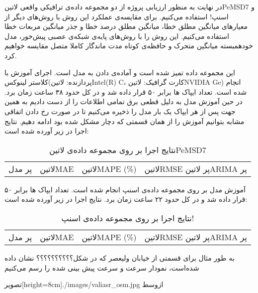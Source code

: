 
در نهایت به منظور ارزیابی پروژه از دو مجموعه داده‌ی ترافیکی واقعی ‌لاتین{PeMSD7} و اسنپ! استفاده می‌کنیم.
برای مقایسه‌ی عملکرد این روش با روش‌های دیگر از معیارهای میانگین مطلق خطا، میانگین مطلق درصد خطا و جذر میانگین مربعات خطا استفاده می‌کنیم.
این روش را با روش‌های پایه‌ی شبکه‌ی عصبی پیش‌خور، مدل خودهمبسته میانگین متحرک و حافظه‌ی کوتاه مدت ماندگار کاملا متصل  مقایسه خواهیم کرد.


این مجموعه داده تمیز شده است و آماده‌ی دادن به مدل است. اجرای آموزش با کلاستر لینوکس(پردازنده: ‌لاتین{Intel(R) C}، کارت گرافیک: ‌لاتین{NVIDIA Ge}) انجام شده است.
تعداد ایپاک ها برابر ۵۰ قرار داده شد و در کل حدود ۳۸ ساعت زمان برد.
در حین آموزش مدل به دلیل قطعی برق تمامی اطلاعات را از دست دادیم به همین جهت پس از هر ایپاک یک بار مدل را ذخیره می‌کنیم تا در صورت رخ دادن اتفاقی مشابه بتوانیم آموزش را از همان قسمتی که دچار مشکل شده بود ادامه دهیم. نتایج اجرا در زیر آورده شده است:

\begin{table}[h]
  \centering
  \caption{نتایج اجرا بر روی مجموعه داده‌ی ‌لاتین{PeMSD7}}
  \begin{tabular}{|c|c|c|c|}
    ‌پر
    مدل & ‌لاتین{MAE} & ‌لاتین{MAPE (\%)} & ‌لاتین{RMSE}
    ‌پر
    ‌لاتین{ARIMA}
    ‌پر
  \end{tabular}
\end{table}


آموزش مدل بر روی مجموعه داده‌ی اسنپ انجام شده است. تعداد ایپاک ها برابر ۵۰ قرار داده شد و در کل حدود ۲۲ ساعت زمان برد. نتایج اجرا در زیر آورده شده است:

\begin{table}[h]
  \centering
  \caption{نتایج اجرا بر روی مجموعه داده‌ی اسنپ!}
  \begin{tabular}{|c|c|c|c|}
    ‌پر
    مدل & ‌لاتین{MAE} & ‌لاتین{MAPE (\%)} & ‌لاتین{RMSE}
    ‌پر
    ‌لاتین{ARIMA}
    ‌پر
  \end{tabular}
\end{table}

به طور مثال برای قسمتی از خیابان ولیعصر که در شکل؟؟؟؟؟؟؟؟؟؟ نشان داده شده‌است، نمودار سرعت و سرعت پیش بینی شده را رسم می‌کنیم

  ‌تصویر[height=8cm]{./images/valiasr_osm.jpg}
  ‌ازوسط

